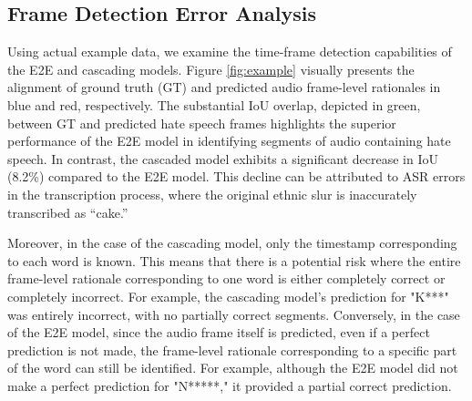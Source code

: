 \documentclass[11pt]{article}
\begin{document}
\subsection{Frame Detection Error Analysis}
Using actual example data, we examine the time-frame detection capabilities of the E2E and cascading models. Figure \ref{fig:example} visually presents the alignment of ground truth (GT) and predicted audio frame-level rationales in blue and red, respectively. The substantial IoU overlap, depicted in green, between GT and predicted hate speech frames highlights the superior performance of the E2E model in identifying segments of audio containing hate speech. In contrast, the cascaded model exhibits a significant decrease in IoU (8.2\%) compared to the E2E model. This decline can be attributed to ASR errors in the transcription process, where the original ethnic slur is inaccurately transcribed as “cake.”

Moreover, in the case of the cascading model, only the timestamp corresponding to each word is known. This means that there is a potential risk where the entire frame-level rationale corresponding to one word is either completely correct or completely incorrect. For example, the cascading model's prediction for "K***" was entirely incorrect, with no partially correct segments. Conversely, in the case of the E2E model, since the audio frame itself is predicted, even if a perfect prediction is not made, the frame-level rationale corresponding to a specific part of the word can still be identified. For example, although the E2E model did not make a perfect prediction for "N*****," it provided a partial correct prediction.


\begin{table}[t]
\centering
{}
\caption{Comparisons of Audio Hate Speech Classification (AHS-CLS) and Frame Detection (AHS-FD) performance for E2E models trained for single-task and multi-task settings.}
\label{tab:multitask}
\end{table}
\end{document}
